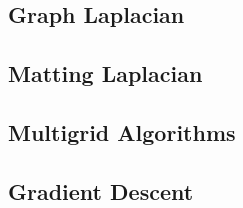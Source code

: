 \subsection{Graph Laplacian}

\subsection{Matting Laplacian}

\subsection{Multigrid Algorithms}
\subsection{Gradient Descent}